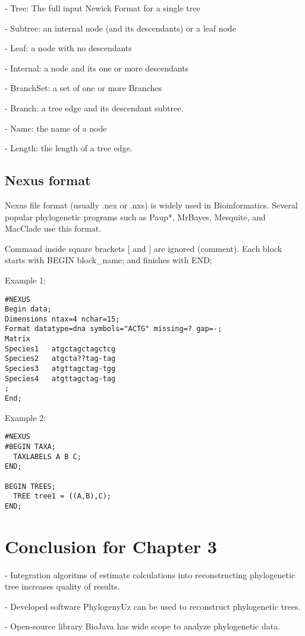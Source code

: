 - Tree: The full input Newick Format for a single tree\par
- Subtree: an internal node (and its descendants) or a leaf node\par
- Leaf: a node with no descendants\par
- Internal: a node and its one or more descendants\par
- BranchSet: a set of one or more Branches\par
- Branch: a tree edge and its descendant subtree.\par
- Name: the name of a node\par
- Length: the length of a tree edge.\par

\subsection{Nexus format}
Nexus file format (usually .nex or .nxs) is widely used 
in Bioinformatics. Several popular phylogenetic programs 
such as Paup*, MrBayes, Mesquite, and MacClade use this format.

Command inside square brackets $[$ and $]$ are ignored (comment). 
Each block starts with BEGIN block_name; and finishes with END;

Example 1:\par
\begin{lstlisting}
#NEXUS
Begin data;
Dimensions ntax=4 nchar=15;
Format datatype=dna symbols="ACTG" missing=? gap=-;
Matrix
Species1   atgctagctagctcg
Species2   atgcta??tag-tag
Species3   atgttagctag-tgg
Species4   atgttagctag-tag           
;
End;
\end{lstlisting}
Example 2:\par
\begin{lstlisting}
#NEXUS
#BEGIN TAXA;
  TAXLABELS A B C;
END;

BEGIN TREES;
  TREE tree1 = ((A,B),C);
END;
\end{lstlisting}

\section*{Conclusion for Chapter 3}

- Integration algoritms of estimate colculations into
reconstructing phylogenetic tree increases quality of results.

- Developed software PhylogenyUz can be used to 
reconstruct phylogenetic trees.

- Open-source library BioJava has wide scope to analyze
phylogenetic data.

\newpage
